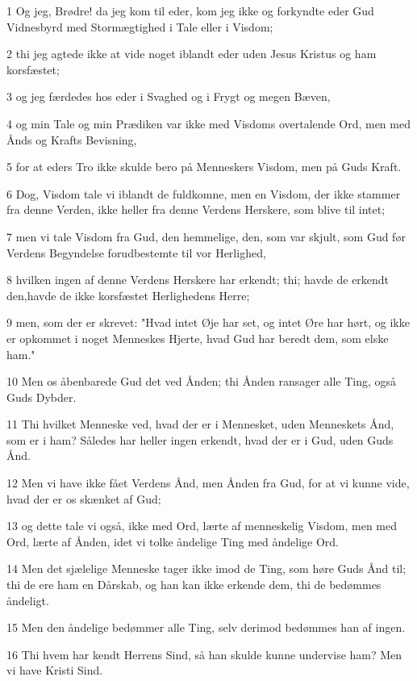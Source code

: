 \par 1 Og jeg, Brødre! da jeg kom til eder, kom jeg ikke og forkyndte eder Gud Vidnesbyrd med Stormægtighed i Tale eller i Visdom;
\par 2 thi jeg agtede ikke at vide noget iblandt eder uden Jesus Kristus og ham korsfæstet;
\par 3 og jeg færdedes hos eder i Svaghed og i Frygt og megen Bæven,
\par 4 og min Tale og min Prædiken var ikke med Visdoms overtalende Ord, men med Ånds og Krafts Bevisning,
\par 5 for at eders Tro ikke skulde bero på Menneskers Visdom, men på Guds Kraft.
\par 6 Dog, Visdom tale vi iblandt de fuldkomne, men en Visdom, der ikke stammer fra denne Verden, ikke heller fra denne Verdens Herskere, som blive til intet;
\par 7 men vi tale Visdom fra Gud, den hemmelige, den, som var skjult, som Gud før Verdens Begyndelse forudbestemte til vor Herlighed,
\par 8 hvilken ingen af denne Verdens Herskere har erkendt; thi; havde de erkendt den,havde de ikke korsfæstet Herlighedens Herre;
\par 9 men, som der er skrevet: "Hvad intet Øje har set, og intet Øre har hørt, og ikke er opkommet i noget Menneskes Hjerte, hvad Gud har beredt dem, som elske ham."
\par 10 Men os åbenbarede Gud det ved Ånden; thi Ånden ransager alle Ting, også Guds Dybder.
\par 11 Thi hvilket Menneske ved, hvad der er i Mennesket, uden Menneskets Ånd, som er i ham? Således har heller ingen erkendt, hvad der er i Gud, uden Guds Ånd.
\par 12 Men vi have ikke fået Verdens Ånd, men Ånden fra Gud, for at vi kunne vide, hvad der er os skænket af Gud;
\par 13 og dette tale vi også, ikke med Ord, lærte af menneskelig Visdom, men med Ord, lærte af Ånden, idet vi tolke åndelige Ting med åndelige Ord.
\par 14 Men det sjælelige Menneske tager ikke imod de Ting, som høre Guds Ånd til; thi de ere ham en Dårskab, og han kan ikke erkende dem, thi de bedømmes åndeligt.
\par 15 Men den åndelige bedømmer alle Ting, selv derimod bedømmes han af ingen.
\par 16 Thi hvem har kendt Herrens Sind, så han skulde kunne undervise ham? Men vi have Kristi Sind.

